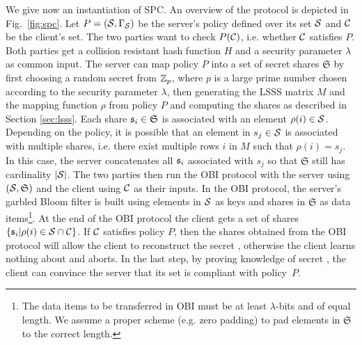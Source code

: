 \noindent
We give now an instantiation of SPC.
An overview of the protocol is depicted in Fig.~\ref{fig:spc}. Let $P=(\mathcal{S},\Gamma_\mathcal{S})$ be the server's policy defined over its set $\mathcal{S}$ and $\mathcal{C}$ be the client's set. 
The two parties want to check $P(\mathcal{C})$, i.e. whether $\mathcal{C}$ satisfies $P$. 
Both parties get a collision resistant hash function $H$ and a security parameter $\lambda$ as common input. 
The server can map policy $P$ into a set of secret shares $\mathfrak{S}$ by first choosing a random secret \secret from $\mathbb{Z}_p$, where $p$ is a large prime number chosen according to the security parameter $\lambda$, then generating the LSSS matrix $M$ and the mapping function $\rho$ from policy $P$ and computing the shares as described in Section \ref{sec:lsss}. 
Each share $\mathfrak{s}_i \in \mathfrak{S}$ is associated with an element $\rho(i)\in \mathcal{S}$. Depending on the policy, it is possible that an element in $s_j\in\mathcal{S}$ is associated with multiple shares, i.e. there exist multiple rows $i$ in $M$ such that $\rho(i)=s_j$. In this case, the server concatenates all $\mathfrak{s}_i$ associated with $s_j$ so that $\mathfrak{S}$ still has cardinality $|\mathcal{S}|$. 
The two parties then run the OBI protocol with the server using $(\mathcal{S}, \mathfrak{S})$ and the client using $\mathcal{C}$ as their inputs. In the OBI protocol, the server's garbled Bloom filter is built using elements in $\mathcal{S}$ as keys and shares in $\mathfrak{S}$ as data items\footnote{The data items to be transferred in OBI must be at least $\lambda$-bits and of equal length. We assume a proper scheme (e.g. zero padding) to pad elements in $\mathfrak{S}$ to the correct length.}.
At the end of the OBI protocol the client gets a set of shares $\{\mathfrak{s}_i|\rho(i)\in \mathcal{S}\cap \mathcal{C}\}$. If $\mathcal{C}$ satisfies policy $P$, then the shares obtained from the OBI protocol will allow the client to reconstruct the secret \secret, otherwise the client learns nothing about \secret and aborts. 
In the last step, by proving knowledge of secret \secret, the client can convince the server that its set is compliant with policy~$P$.


